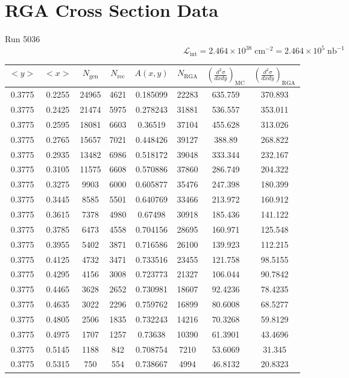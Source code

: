 \chapter{RGA Cross Section Data}
\label{apdx:C}

\begin{center}
	Run 5036
	\begin{equation}
	\nonumber
	\mathscr{L_{\mathrm{int}}} = 2.464 \times 10^{38} \; \mathrm{cm}^{-2} = 2.464 \times 10^{5} \; \mathrm{nb}^{-1}
	\end{equation}
\end{center}

\begin{table}[h!]
	\centering
	\begin{tabular}{ |c|c|c|c|c|c|c|c| } 
		\hline
		$<y>$ & $<x>$ & $N_{\mathrm{gen}}$ & $N_{\mathrm{rec}}$ & $A(x,y)$ & $N_{\mathrm{RGA}}$ & $\left( \frac{d^2\sigma}{dxdy} \right)_{\mathrm{MC}}$ & $\left( \frac{d^2\sigma}{dxdy} \right)_{\mathrm{RGA}}$ \\
		\hline
		0.3775 & 0.2255 & 24965 & 4621 & 0.185099 & 22283 & 635.759 & 370.893 \\ 
		0.3775 & 0.2425 & 21474 & 5975 & 0.278243 & 31881 & 536.557 & 353.011 \\ 
		0.3775 & 0.2595 & 18081 & 6603 & 0.36519 & 37104 & 455.628 & 313.026 \\ 
		0.3775 & 0.2765 & 15657 & 7021 & 0.448426 & 39127 & 388.89 & 268.822 \\ 
		0.3775 & 0.2935 & 13482 & 6986 & 0.518172 & 39048 & 333.344 & 232.167 \\ 
		0.3775 & 0.3105 & 11575 & 6608 & 0.570886 & 37860 & 286.749 & 204.322 \\ 
		0.3775 & 0.3275 & 9903 & 6000 & 0.605877 & 35476 & 247.398 & 180.399 \\ 
		0.3775 & 0.3445 & 8585 & 5501 & 0.640769 & 33466 & 213.972 & 160.912 \\ 
		0.3775 & 0.3615 & 7378 & 4980 & 0.67498 & 30918 & 185.436 & 141.122 \\ 
		0.3775 & 0.3785 & 6473 & 4558 & 0.704156 & 28695 & 160.971 & 125.548 \\ 
		0.3775 & 0.3955 & 5402 & 3871 & 0.716586 & 26100 & 139.923 & 112.215 \\
		0.3775 & 0.4125 & 4732 & 3471 & 0.733516 & 23455 & 121.758 & 98.5155 \\ 
		0.3775 & 0.4295 & 4156 & 3008 & 0.723773 & 21327 & 106.044 & 90.7842 \\ 
		0.3775 & 0.4465 & 3628 & 2652 & 0.730981 & 18607 & 92.4236 & 78.4235 \\ 
		0.3775 & 0.4635 & 3022 & 2296 & 0.759762 & 16899 & 80.6008 & 68.5277 \\ 
		0.3775 & 0.4805 & 2506 & 1835 & 0.732243 & 14216 & 70.3268 & 59.8129 \\ 
		0.3775 & 0.4975 & 1707 & 1257 & 0.73638 & 10390 & 61.3901 & 43.4696 \\ 
		0.3775 & 0.5145 & 1188 & 842 & 0.708754 & 7210 & 53.6069 & 31.345 \\ 
		0.3775 & 0.5315 & 750 & 554 & 0.738667 & 4994 & 46.8132 & 20.8323 \\ 
		\hline
	\end{tabular}
\end{table}

